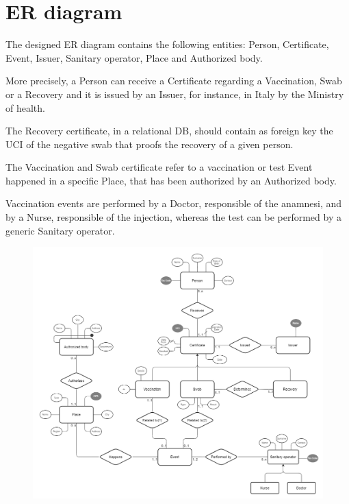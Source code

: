 \documentclass{article}
\begin{document}
\section{ER diagram}


The designed ER diagram contains the following entities: Person, Certificate, Event, Issuer, Sanitary operator, Place and Authorized body. 

More precisely, a Person can receive a Certificate regarding a Vaccination, Swab or a Recovery and it is issued by an Issuer, for instance, in Italy by the Ministry of health. 

The Recovery certificate, in a relational DB, should contain as foreign key the UCI of the negative swab that proofs the recovery of a given person.

The Vaccination and Swab certificate refer to a vaccination or test Event happened in a specific Place, that has been authorized by an Authorized body. 

Vaccination events are performed by a Doctor, responsible of the anamnesi, and by a Nurse, responsible of the injection, whereas the test can be performed by a generic Sanitary operator.
\hfill\break


\begin{figure}[h!]
\centering
\includegraphics[scale=0.30]{er.png}
\end{figure}
\newpage
\end{document}
